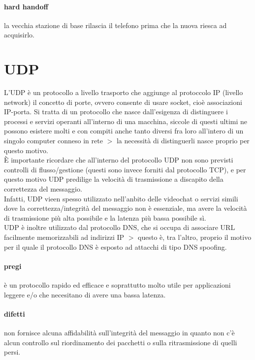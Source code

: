 \documentclass{article}
\begin{document}
\paragraph{hard handoff} la vecchia stazione di base rilascia il telefono prima
che la nuova riesca ad acquisirlo.

\section{UDP}

L'UDP è un protocollo a livello trasporto che aggiunge al protoccolo IP (livello
network) il concetto di porte, ovvero consente di usare socket, cioè
associazioni IP-porta. Si tratta di un protocollo che nasce dall'esigenza di
distinguere i processi e servizi operanti all'interno di una macchina, siccole
di questi ultimi ne possono esistere molti e con compiti anche tanto diversi fra
loro all'intero di un singolo computer conneso in rete $>$ la necessità di
distinguerli nasce proprio per questo motivo.\\
È importante ricordare che all'interno del protocollo UDP non sono previsti
controlli di flusso/gestione (questi sono invece forniti dal protocollo TCP), e
per questo motivo UDP predilige la velocità di trasmissione a discapito della
correttezza del messaggio.\\
Infatti, UDP vieen spesso utilizzato nell'anbito delle videochat o servizi
simili dove la correttezza/integrità del messaggio non è essenziale, ma avere la
velocità di trasmissione più alta possibile e la latenza più bassa possibile
sì.\\
UDP è inoltre utilizzato dal protocollo DNS, che si occupa di associare URL
facilmente memorizzabili ad indirizzi IP $>$ questo è, tra l'altro, proprio il
motivo per il quale il protocollo DNS è esposto ad attacchi di tipo DNS
spoofing.

\paragraph{pregi} è un protocollo rapido ed efficace e soprattutto molto utile
per applicazioni leggere e/o che necesitano di avere una bassa latenza.

\paragraph{difetti} non fornisce alcuna affidabilità sull'integrità del
messaggio in quanto non c'è alcun controllo sul riordinamento dei pacchetti o
sulla ritrasmissione di quelli persi.
\end{document}
